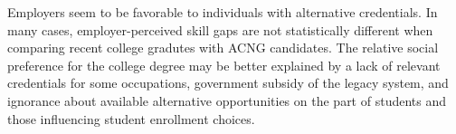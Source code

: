 \documentclass[review]{elsarticle}
\begin{document}
Employers seem to be favorable to individuals with alternative credentials.
In many cases, employer-perceived skill gaps are not statistically different when comparing recent college gradutes with ACNG candidates.
The relative social preference for the college degree may be better explained by a lack of relevant credentials for some occupations,
government subsidy of the legacy system,
and ignorance about available alternative opportunities on the part of students and those influencing student enrollment choices.



\end{document}
